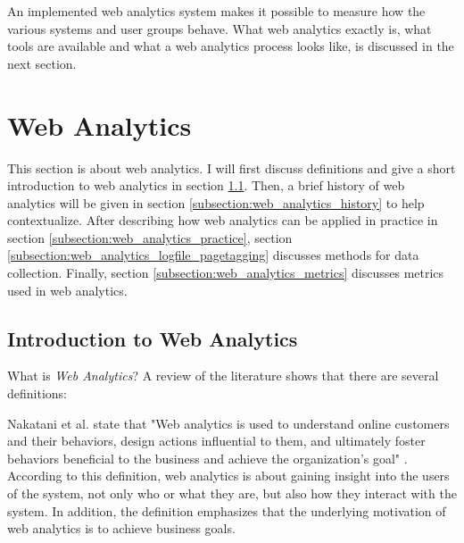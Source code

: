 An implemented web analytics system makes it possible to measure how the various systems and user groups behave.
What web analytics exactly is, what tools are available and what a web analytics process looks like, is discussed in the next section.








\section{Web Analytics} %
\label{section:web_analytics}

This section is about web analytics.
I will first discuss definitions and give a short introduction to web analytics in section \ref{subsection:web_analytics_introduction}.
Then, a brief history of web analytics will be given in section \ref{subsection:web_analytics_history} to help contextualize.
After describing how web analytics can be applied in practice in section \ref{subsection:web_analytics_practice}, section \ref{subsection:web_analytics_logfile_pagetagging} discusses methods for data collection.
Finally, section \ref{subsection:web_analytics_metrics} discusses metrics used in web analytics.


\subsection{Introduction to Web Analytics} %
\label{subsection:web_analytics_introduction}

What is \textit{Web Analytics}?
A review of the literature shows that there are several definitions:

Nakatani et al. state that "Web analytics is used to understand online customers and their behaviors, design actions influential to them, and ultimately foster behaviors beneficial to the business and achieve the organization's goal" \cite{2011Nakatani}.
According to this definition, web analytics is about gaining insight into the users of the system, not only who or what they are, but also how they interact with the system.
In addition, the definition emphasizes that the underlying motivation of web analytics is to achieve business goals.

